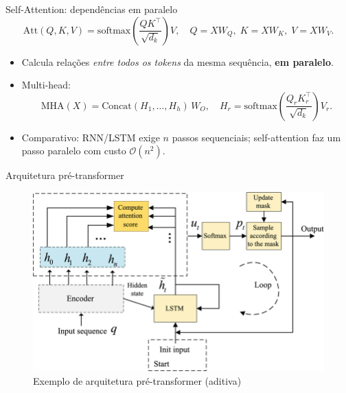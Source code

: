 \documentclass{beamer}
\begin{document}
\begin{frame}{Self-Attention: dependências em paralelo}
	\[
		\mathrm{Att}(Q,K,V)=\mathrm{softmax}\!\left(\frac{QK^\top}{\sqrt{d_k}}\right)V,
		\quad
		Q = XW_Q,\; K = XW_K,\; V = XW_V.
	\]
	\begin{itemize}
		\item Calcula relações \emph{entre todos os tokens} da mesma sequência, \textbf{em paralelo}.
		\item Multi-head:
		      \[
			      \mathrm{MHA}(X)=\mathrm{Concat}(H_1,\dots,H_h)\,W_O,\quad
			      H_r=\mathrm{softmax}\!\left(\frac{Q_r K_r^\top}{\sqrt{d_k}}\right)V_r.
		      \]
		\item Comparativo: RNN/LSTM exige $n$ passos sequenciais; self-attention faz um passo paralelo com custo $\mathcal{O}(n^2)$.
	\end{itemize}
\end{frame}

\begin{frame}{Arquitetura pré-transformer}
\begin{figure}
  \centering
  \includegraphics[height=0.75\textheight]{assets/The-framework-of-additive-attention-mechanism-in-decoder.png}
  \caption{Exemplo de arquitetura pré-transformer (aditiva) \cite{gu2022pointer}}
\end{figure}
\end{frame}
\end{document}
